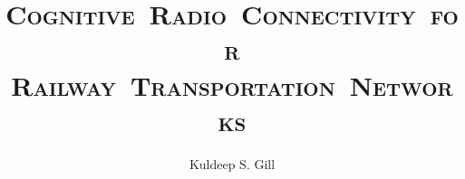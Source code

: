 \documentclass[11pt]{mvlthesis}
\title{\scshape \mbox{Cognitive Radio Connectivity for}\\
\scshape \mbox{Railway Transportation Networks}}
\author{Kuldeep S. Gill}
\begin{document}
\maketitle
\begin{abstract}



\end{abstract}

\begin{acknowledgements}



\end{acknowledgements}

\tableofcontents
\listoffigures
\listoftables



%















\appendix


\end{document}
